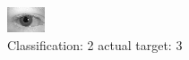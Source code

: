 \begin{figure}[h!]
\begin{center}
\includegraphics[width=0.60\columnwidth]{figures/ID613_class_2_target_3.png}
\end{center}
\caption{ Classification: 2 actual target: 3}
\label{fig:ID613_class_2_target_3}
\end{figure}
